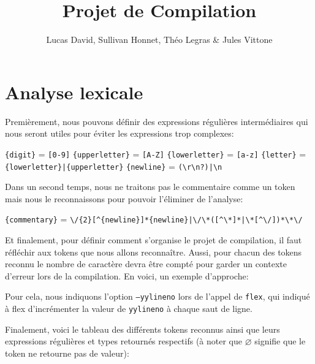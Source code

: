 \documentclass[12pt,a4paper]{article}
\begin{document}
\title{\bfseries Projet de Compilation}
\author{Lucas David, Sullivan Honnet, Théo Legras \& Jules Vittone}
\date{}
\maketitle

\part{Analyse lexicale}

Premièrement, nous pouvons définir des expressions régulières intermédiaires qui nous seront utiles pour éviter les expressions trop complexes:

\verb|{digit}| = \verb|[0-9]| \newline
\verb|{upperletter}| = \verb|[A-Z]| \newline
\verb|{lowerletter}| = \verb|[a-z]| \newline
\verb|{letter}| = \verb!{lowerletter}|{upperletter}! \newline
\verb|{newline}| = \verb!(\r\n?)|\n!

Dans un second temps, nous ne traitons pas le commentaire comme un token mais nous le reconnaissons pour pouvoir l'éliminer de l'analyse:

\verb|{commentary}| = \verb!\/{2}[^{newline}]*{newline}|\/\*([^\*]*|\*[^\/])*\*\/!

Et finalement, pour définir comment s'organise le projet de compilation, il faut réfléchir aux tokens que nous allons reconnaître. Aussi, pour chacun des tokens reconnu le nombre de caractère devra être compté pour garder un contexte d'erreur lors de la compilation. En voici, un exemple d'approche:

Pour cela, nous indiquons l'option \texttt{--yylineno} lors de l'appel de \texttt{flex}, qui indiqué à flex d'incrémenter la valeur de \texttt{yylineno} à chaque saut de ligne.

\newpage

Finalement, voici le tableau des différents tokens reconnus ainsi que leurs expressions régulières et types retournés respectifs (à noter que $\varnothing$ signifie que le token ne retourne pas de valeur):
\end{document}
